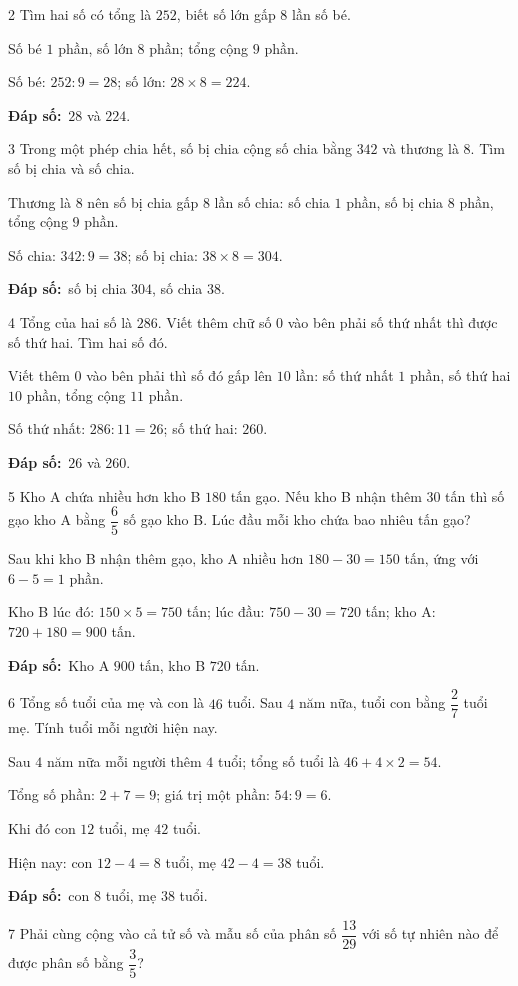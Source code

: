 \documentclass[11pt]{article}
\newif\ifsol \solfalse
\providecommand{\AnsWord}{Đáp số}
\newcommand{\dapso}[1]{\par\textbf{\AnsWord:}\ #1}
\newcommand{\probsol}[1]{%
  \begin{lrbox}{\solmeasure}\begin{minipage}{\dimexpr\linewidth-24pt\relax}#1\end{minipage}\end{lrbox}%
  \ifsol
    \begin{solbox}#1\end{solbox}%
  \else
    \setlength{\solht}{\dimexpr\ht\solmeasure+\dp\solmeasure+0.85cm\relax}%
    \ifdim\solht<1.35cm\setlength{\solht}{1.35cm}\fi
    \begin{tcolorbox}[colback=white,colframe=Line,boxrule=0.8pt,arc=5pt,
      left=8pt,right=8pt,top=4pt,bottom=4pt,height=\solht]{\footnotesize\color{Slate}\itshape\WorkWord}\end{tcolorbox}%
  \fi}
\newcommand{\gap}{\vspace{0.3cm}}
\def\WorkWord{Bài làm:}
\def\AnsWord{Đáp số}
\begin{document}
\gap
\begin{probbox}{2}{\relax}
Tìm hai số có tổng là $252$, biết số lớn gấp $8$ lần số bé.
\end{probbox}
\probsol{
Số bé $1$ phần, số lớn $8$ phần; tổng cộng $9$ phần.\par Số bé: $252:9=28$; số lớn: $28\times8=224$.
\dapso{$28$ và $224$.}}
\gap
\begin{probbox}{3}{\relax}
Trong một phép chia hết, số bị chia cộng số chia bằng $342$ và thương là $8$. Tìm số bị chia và số chia.
\end{probbox}
\probsol{
Thương là $8$ nên số bị chia gấp $8$ lần số chia: số chia $1$ phần, số bị chia $8$ phần, tổng cộng $9$ phần.\par
Số chia: $342:9=38$; số bị chia: $38\times8=304$.
\dapso{số bị chia $304$, số chia $38$.}}
\gap
\begin{probbox}{4}{\relax}
Tổng của hai số là $286$. Viết thêm chữ số $0$ vào bên phải số thứ nhất thì được số thứ hai. Tìm hai số đó.
\end{probbox}
\probsol{
Viết thêm $0$ vào bên phải thì số đó gấp lên $10$ lần: số thứ nhất $1$ phần, số thứ hai $10$ phần, tổng cộng $11$ phần.\par
Số thứ nhất: $286:11=26$; số thứ hai: $260$.
\dapso{$26$ và $260$.}}
\gap
\begin{probbox}{5}{\relax}
Kho A chứa nhiều hơn kho B $180$ tấn gạo. Nếu kho B nhận thêm $30$ tấn thì số gạo kho A bằng $\dfrac65$ số gạo kho B. Lúc đầu mỗi kho chứa bao nhiêu tấn gạo?
\end{probbox}
\probsol{
Sau khi kho B nhận thêm gạo, kho A nhiều hơn $180-30=150$ tấn, ứng với $6-5=1$ phần.\par
Kho B lúc đó: $150\times5=750$ tấn; lúc đầu: $750-30=720$ tấn; kho A: $720+180=900$ tấn.
\dapso{Kho A $900$ tấn, kho B $720$ tấn.}}
\gap
\begin{probbox}{6}{\relax}
Tổng số tuổi của mẹ và con là $46$ tuổi. Sau $4$ năm nữa, tuổi con bằng $\dfrac27$ tuổi mẹ. Tính tuổi mỗi người hiện nay.
\end{probbox}
\probsol{
Sau $4$ năm nữa mỗi người thêm $4$ tuổi; tổng số tuổi là $46+4\times2=54$.\par
Tổng số phần: $2+7=9$; giá trị một phần: $54:9=6$.\par Khi đó con $12$ tuổi, mẹ $42$ tuổi.\par
Hiện nay: con $12-4=8$ tuổi, mẹ $42-4=38$ tuổi.
\dapso{con $8$ tuổi, mẹ $38$ tuổi.}}
\gap
\begin{probbox}{7}{\relax}
Phải cùng cộng vào cả tử số và mẫu số của phân số $\dfrac{13}{29}$ với số tự nhiên nào để được phân số bằng $\dfrac35$?
\end{probbox}
\end{document}
